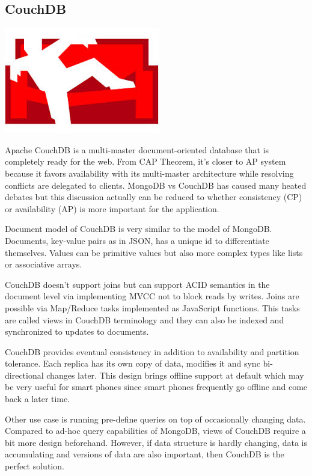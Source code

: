 \subsection{CouchDB}

\vspace{-1.15cm} \hspace{3.8cm} \includegraphics[scale=0.2]{3/figures/couchdb.jpg}

Apache CouchDB is a multi-master document-oriented database that is completely ready for the web.
From CAP Theorem, it's closer to AP system because it favors availability with its multi-master architecture while resolving conflicts are delegated to clients.
MongoDB vs CouchDB has caused many heated debates but this discussion actually can be reduced to whether consistency (CP) or availability (AP) is more important for the application.

Document model of CouchDB is very similar to the model of MongoDB. Documents, key-value pairs as in JSON, has a unique id to differentiate themselves.
Values can be primitive values but also more complex types like lists or associative arrays.

CouchDB doesn't support joins but can support ACID semantics in the document level via implementing MVCC not to block reads by writes.
Joins are possible via Map/Reduce tasks implemented as JavaScript functions.
This tasks are called views in CouchDB terminology and they can also be indexed and synchronized to updates to documents.

CouchDB provides eventual consistency in addition to availability and partition tolerance.
Each replica has its own copy of data, modifies it and sync bi-directional changes later.
This design brings offline support at default which may be very useful for smart phones since smart phones frequently go offline and come back a later time.

Other use case is running pre-define queries on top of occasionally changing data.
Compared to ad-hoc query capabilities of MongoDB, views of CouchDB require a bit more design beforehand.
However, if data structure is hardly changing, data is accumulating and versions of data are also important, then CouchDB is the perfect solution.

